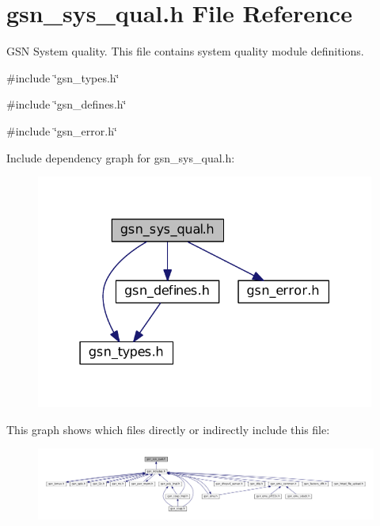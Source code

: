 \hypertarget{a00593}{
\section{gsn\_\-sys\_\-qual.h File Reference}
\label{a00593}
}


GSN System quality. This file contains system quality module definitions.  


{\ttfamily \#include \char`\"{}gsn\_\-types.h\char`\"{}}\par
{\ttfamily \#include \char`\"{}gsn\_\-defines.h\char`\"{}}\par
{\ttfamily \#include \char`\"{}gsn\_\-error.h\char`\"{}}\par
Include dependency graph for gsn\_\-sys\_\-qual.h:
\nopagebreak
\begin{figure}[H]
\begin{center}
\leavevmode
\includegraphics[width=316pt]{a00837}
\end{center}
\end{figure}
This graph shows which files directly or indirectly include this file:
\nopagebreak
\begin{figure}[H]
\begin{center}
\leavevmode
\includegraphics[width=400pt]{a00838}
\end{center}
\end{figure}
